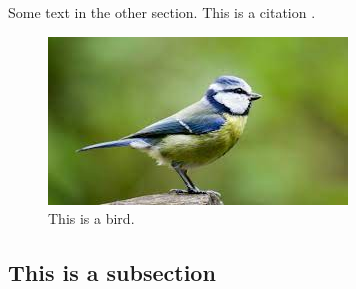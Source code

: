 \documentclass[12pt]{article}
\begin{document}
Some text in the other section.  This is a citation \cite{ctt_website}.

\begin{figure}[ht]
	\centering
	\includegraphics[scale=1.0]{Figures/bird.jpg}
	\caption{This is a bird.}
\end{figure}


\subsection{This is a subsection}



\newpage


\end{document}
